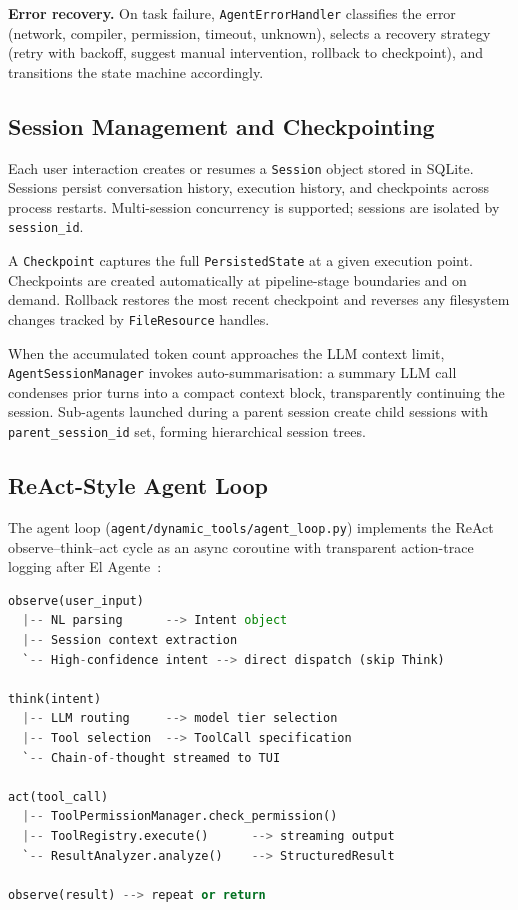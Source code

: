 \documentclass[11pt,a4paper]{article}
\begin{document}
\textbf{Error recovery.} On task failure, \texttt{AgentErrorHandler} classifies
the error (network, compiler, permission, timeout, unknown), selects a recovery
strategy (retry with backoff, suggest manual intervention, rollback to
checkpoint), and transitions the state machine accordingly.

\subsection{Session Management and Checkpointing}

Each user interaction creates or resumes a \texttt{Session} object stored in
SQLite. Sessions persist conversation history, execution history, and checkpoints
across process restarts. Multi-session concurrency is supported; sessions are
isolated by \texttt{session\_id}.

A \texttt{Checkpoint} captures the full \texttt{PersistedState} at a given
execution point. Checkpoints are created automatically at pipeline-stage
boundaries and on demand. Rollback restores the most recent checkpoint and
reverses any filesystem changes tracked by \texttt{FileResource} handles.

When the accumulated token count approaches the LLM context limit,
\texttt{AgentSessionManager} invokes auto-summarisation: a summary LLM call
condenses prior turns into a compact context block, transparently continuing the
session. Sub-agents launched during a parent session create child sessions with
\texttt{parent\_session\_id} set, forming hierarchical session trees.

\subsection{ReAct-Style Agent Loop}
\label{sec:proxima-loop}

The agent loop (\texttt{agent/dynamic\_tools/agent\_loop.py}) implements the
ReAct~\cite{yao2023react} observe--think--act cycle as an async coroutine with
transparent action-trace logging after El Agente~\cite{zou2025elagente}:

\begin{lstlisting}[language=Python, caption={Agent loop pseudocode}]
observe(user_input)
  |-- NL parsing      --> Intent object
  |-- Session context extraction
  `-- High-confidence intent --> direct dispatch (skip Think)

think(intent)
  |-- LLM routing     --> model tier selection
  |-- Tool selection  --> ToolCall specification
  `-- Chain-of-thought streamed to TUI

act(tool_call)
  |-- ToolPermissionManager.check_permission()
  |-- ToolRegistry.execute()      --> streaming output
  `-- ResultAnalyzer.analyze()    --> StructuredResult

observe(result) --> repeat or return
\end{lstlisting}
\end{document}
